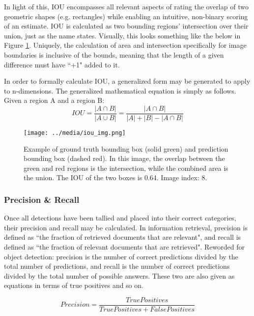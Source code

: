 In light of this, IOU encompasses all relevant aspects of rating the overlap of two geometric shapes (e.g. rectangles) while enabling an intuitive, non-binary scoring of an estimate. IOU is calculated as two bounding regions' intersection over their union, just as the name states. Visually, this looks something like the below in Figure \ref{iou_img}. Uniquely, the calculation of area and intersection specifically for image boundaries is inclusive of the bounds, meaning that the length of a given difference must have ``+1" added to it.

In order to formally calculate IOU, a generalized form may be generated to apply to n-dimensions. The generalized mathematical equation is simply as follows. Given a region A and a region B:
\begin{equation}
IOU = \frac{|A\cap B|}{|A\cup B|} = \frac{|A\cap B|}{|A|+|B|- |A\cap B|}
\end{equation}

\begin{figure}[ht]
    \texttt{[image: ../media/iou\_img.png]}
    \caption{Example of ground truth bounding box (solid green) and prediction bounding box (dashed red). In this image, the overlap between the green and red regions is the intersection, while the combined area is the union. The IOU of the two boxes is 0.64. Image index: 8.}
    \label{iou_img}
\end{figure}

\subsubsection{Precision \& Recall}
\label{subsect_precrec}
Once all detections have been tallied and placed into their correct categories, their precision and recall may be calculated. In information retrieval, precision is defined as ``the fraction of retrieved documents that are relevant", and recall is defined as ``the fraction of relevant documents that are retrieved". Reworded for object detection: precision is the number of correct predictions divided by the total number of predictions, and recall is the number of correct predictions divided by the total number of possible answers. These two are also given as equations in terms of true positives and so on.

\begin{equation}
Precision = \frac{TruePositives}{TruePositives + FalsePositives}
\label{eq_prec}
\end{equation}

